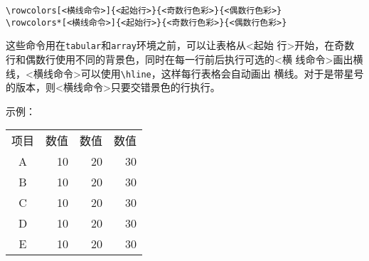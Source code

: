 \documentclass{article}
\begin{document}
\begin{verbatim}
\rowcolors[<横线命令>]{<起始行>}{<奇数行色彩>}{<偶数行色彩>}
\rowcolors*[<横线命令>]{<起始行>}{<奇数行色彩>}{<偶数行色彩>}
\end{verbatim}

这些命令用在\texttt{tabular}和\texttt{array}环境之前，可以让表格从<起始
行>开始，在奇数行和偶数行使用不同的背景色，同时在每一行前后执行可选的<横
线命令>画出横线，<横线命令>可以使用\verb!\hline!，这样每行表格会自动画出
横线。对于是带星号的版本，则<横线命令>只要交错景色的行执行。

示例：

\begin{table}[H]
  \centering
  \begin{tabular}{crrr}
    \hline
    \rowcolor{black!30}
    项目 & 数值 & 数值 & 数值 \\
    A & 10 & 20 & 30 \\
    B & 10 & 20 & 30 \\
    C & 10 & 20 & 30 \\
    D & 10 & 20 & 30 \\
    E & 10 & 20 & 30 \\
    \hline
  \end{tabular}
\end{table}
\end{document}
